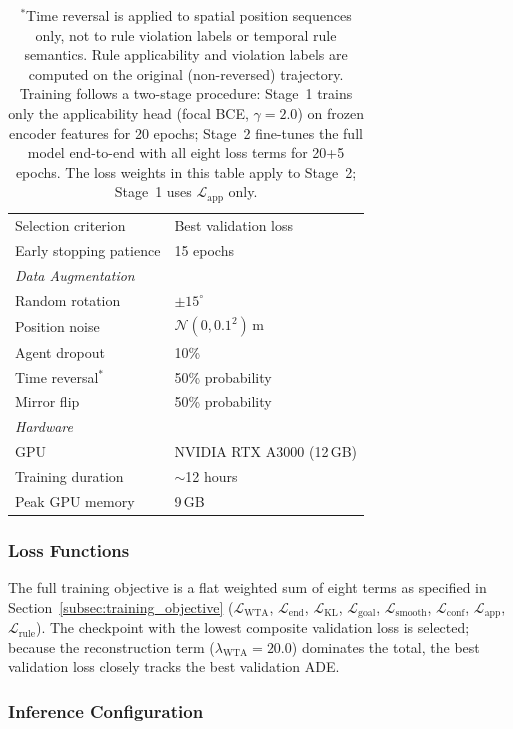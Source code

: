 \begin{table}[t]
\begin{tabular}{ll}
Selection criterion & Best validation loss \\
Early stopping patience & 15 epochs \\
\midrule
\multicolumn{2}{l}{\textit{Data Augmentation}} \\
Random rotation & $\pm 15^\circ$ \\
Position noise & $\mathcal{N}(0, 0.1^2)$\,m \\
Agent dropout & 10\% \\
Time reversal$^*$ & 50\% probability \\
Mirror flip & 50\% probability \\
\midrule
\multicolumn{2}{l}{\textit{Hardware}} \\
GPU & NVIDIA RTX A3000 (12\,GB) \\
Training duration & $\sim$12 hours \\
Peak GPU memory & 9\,GB \\
\bottomrule
\end{tabular}
\vspace{1mm}
\caption*{\footnotesize $^*$Time reversal is applied to spatial position sequences only, not to rule violation labels or temporal rule semantics. Rule applicability and violation labels are computed on the original (non-reversed) trajectory.  Training follows a two-stage procedure: Stage~1 trains only the applicability head (focal BCE, $\gamma{=}2.0$) on frozen encoder features for 20 epochs; Stage~2 fine-tunes the full model end-to-end with all eight loss terms for 20+5 epochs.  The loss weights in this table apply to Stage~2; Stage~1 uses $\mathcal{L}_{\text{app}}$ only.}
\end{table}

\subsubsection{Loss Functions}

The full training objective is a flat weighted sum of eight terms as specified in Section~\ref{subsec:training_objective} ($\mathcal{L}_{\text{WTA}}$, $\mathcal{L}_{\text{end}}$, $\mathcal{L}_{\text{KL}}$, $\mathcal{L}_{\text{goal}}$, $\mathcal{L}_{\text{smooth}}$, $\mathcal{L}_{\text{conf}}$, $\mathcal{L}_{\text{app}}$, $\mathcal{L}_{\text{rule}}$). The checkpoint with the lowest composite validation loss is selected; because the reconstruction term ($\lambda_{\text{WTA}}{=}20.0$) dominates the total, the best validation loss closely tracks the best validation ADE.

\subsubsection{Inference Configuration}

